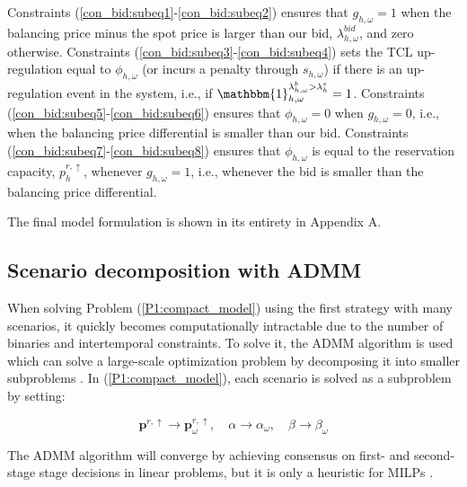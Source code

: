 Constraints (\ref{con_bid:subeq1}-\ref{con_bid:subeq2}) ensures that $g_{h,\omega} = 1$ when the balancing price minus the spot price is larger than our bid, $\lambda^{bid}_{h, \omega}$, and zero otherwise. Constraints (\ref{con_bid:subeq3}-\ref{con_bid:subeq4}) sets the TCL up-regulation equal to $\phi_{h,\omega}$ (or incurs a penalty through $s_{h,\omega}$) if there is an up-regulation event in the system, i.e., if $\mathbbm{1}_{h,\omega}^{\lambda^{b}_{h,\omega} > \lambda^{s}_{h}} = 1$. Constraints (\ref{con_bid:subeq5}-\ref{con_bid:subeq6}) ensures that $\phi_{h,\omega} = 0$ when $g_{h,\omega} = 0$, i.e., when the balancing price differential is smaller than our bid. Constraints (\ref{con_bid:subeq7}-\ref{con_bid:subeq8}) ensures that $\phi_{h,\omega}$ is equal to the reservation capacity, $p^{r,\uparrow}_{h}$, whenever $g_{h,\omega} = 1$, i.e., whenever the bid is smaller than the balancing price differential.

The final model formulation is shown in its entirety in Appendix A.

\subsection{Scenario decomposition with ADMM}

When solving Problem (\ref{P1:compact_model}) using the first strategy with many scenarios, it quickly becomes computationally intractable due to the number of binaries and intertemporal constraints. To solve it, the ADMM algorithm is used which can solve a large-scale optimization problem by decomposing it into smaller subproblems \cite{boyd2011distributed}. In (\ref{P1:compact_model}), each scenario is solved as a subproblem by setting:

\begin{equation}\label{eq:non_anticipativity}
    \bm{p}^{r,\uparrow} \rightarrow \bm{p}^{r,\uparrow}_{\omega}, \quad \alpha \rightarrow \alpha_{\omega}, \quad \beta \rightarrow \beta_{\omega}
\end{equation}

The ADMM algorithm will converge by achieving consensus on first- and second-stage stage decisions in linear problems, but it is only a heuristic for MILPs \cite{hong2016convergence}.
